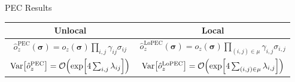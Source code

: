 \documentclass[11pt,aspectratio=1610,xcolor=dvipsnames]{beamer}
\begin{document}
\begin{frame}{PEC Results}
	\begin{table}[h]
		\centering\begin{tabular}{c | c}
			Unlocal                                                                                                         & Local                                                                                                                            \\ \toprule
			$\hat{o}_z^\text{PEC}(\boldsymbol{\sigma}) = o_z(\boldsymbol{\sigma})\prod\limits_{i, j}\gamma_{ij}\sigma_{ij}$ & $\hat{o}_z^\text{LoPEC}(\boldsymbol{\sigma}) = o_z(\boldsymbol{\sigma})\prod\limits_{(i, j) \in \mu} \gamma_{i, j}\sigma_{i, j}$ \\
			$\operatorname{Var}\!\qty[\hat{o}_z^\text{PEC}] = \order{\exp[4\sum_{i,j}\lambda_{ij}]}$                        & $\operatorname{Var}\!\qty[\hat{o}_z^\text{LoPEC}] = \order{\exp[4\sum_{(i, j) \in \mu}\lambda_{i, j}]}$
		\end{tabular}
	\end{table}
\end{frame}
\end{document}
